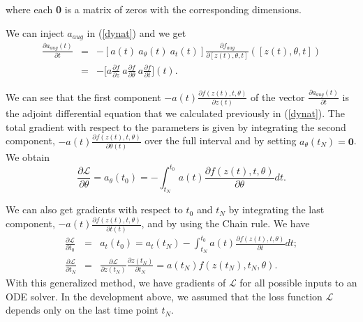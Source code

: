 \documentclass[10pt,a4paper]{article}
\theoremstyle{definition}
\theoremstyle{plain}
\begin{document}
where each \textbf{0} is a matrix of zeros with the corresponding dimensions.

We can inject $a_{aug}$ in (\ref{dynat}) and we get
\begin{eqnarray*}
\frac{\partial a_{aug}(t)}{\partial t} 
&=& - [a(t) \ a_\theta (t) \ a_t (t)]\frac{\partial f_{aug}}{\partial [ z(t),\theta , t]}([z(t),\theta , t]) \\
&=& -\Big[a\frac{\partial f}{\partial z} \ a\frac{\partial f}{\partial \theta} \ a\frac{\partial  f}{\partial t}\Big] (t).
\end{eqnarray*}


We can see that the first component $-a(t)\frac{\partial f(z(t),t,\theta)}{\partial z(t)}$ of the vector $\frac{\partial a_{aug}(t)}{\partial t} $ is the adjoint differential equation that we calculated previously in (\ref{dynat}). The total gradient with respect to the parameters is given by integrating the second component, $-a(t)\frac{\partial f(z(t),t,\theta)}{\partial \theta(t)}$ over the full interval and by setting $a_\theta (t_N) = \textbf{0}$. We obtain 
\begin{equation*}
\frac{\partial \mathcal{L}}{\partial \theta} = a_\theta (t_0) = - \int_{t_N}^{t_0} a(t) \frac{\partial f(z(t),t,\theta)}{\partial \theta} dt.
\end{equation*}


We can also get gradients with respect to $t_0$ and $t_N$ by integrating the last component, $-a(t)\frac{\partial f(z(t),t,\theta)}{\partial t(t)}$, and by using the Chain rule. We have
\begin{eqnarray*}
\frac{\partial \mathcal{L}}{\partial t_0} &=& a_t(t_0) = a_t(t_N) - \int_{t_N}^{t_0} a(t) \frac{\partial f(z(t),t,\theta)}{\partial t} dt ; \\
\frac{\partial \mathcal{L}}{\partial t_N} &=& \frac{\partial \mathcal{L}}{\partial z(t_N)} \frac{\partial z(t_N)}{\partial t_N} = a(t_N)f(z(t_N),t_N,\theta).
\end{eqnarray*}
With this generalized method, we have gradients of $\mathcal{L}$ for all possible inputs to an ODE solver. In the development above, we assumed that the loss function $\mathcal{L}$ depends only on the last time point $t_N$.
\end{document}
